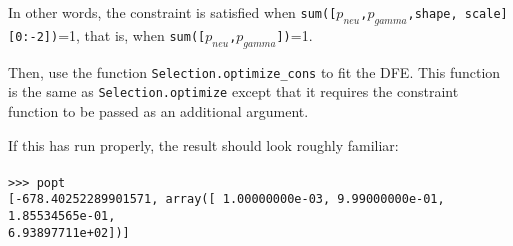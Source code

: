 \documentclass[11pt]{article}
\begin{document}


In other words, the constraint is satisfied when \texttt{sum([$p_{neu}$,$p_{gamma}$,shape, scale][0:-2])}=1, that is, when \texttt{sum([$p_{neu}$,$p_{gamma}$])}=1.

Then, use the function \texttt{Selection.optimize\_cons} to fit the DFE. This function is the same as \texttt{Selection.optimize} except that it requires the constraint function to be passed as an additional argument.



If this has run properly, the result should look roughly familiar: \\ \\
\texttt{>>> popt} \\
\texttt{[-678.40252289901571, array([  1.00000000e-03,   9.99000000e-01,   1.85534565e-01,} \\
\texttt{6.93897711e+02])]}

{}

\end{document}
